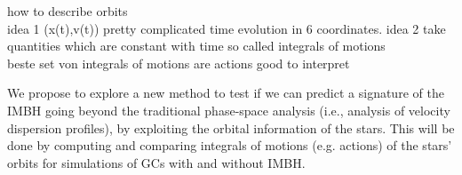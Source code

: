 \color{green} how to describe orbits \\ idea 1 (x(t),v(t)) pretty complicated time evolution in 6 coordinates. idea 2 take quantities which are constant with time so called integrals of motions \\ beste set von integrals of motions are actions good to interpret \color{black}
\\\par We propose to explore a new method to test if we can predict a signature of the \ac{IMBH} going beyond the traditional phase-space analysis (i.e., analysis of velocity dispersion profiles), by exploiting the orbital information of the stars. This will be done by computing and comparing integrals of motions (e.g. actions) of the stars' orbits for simulations of \acp{GC} with and without \ac{IMBH}.

